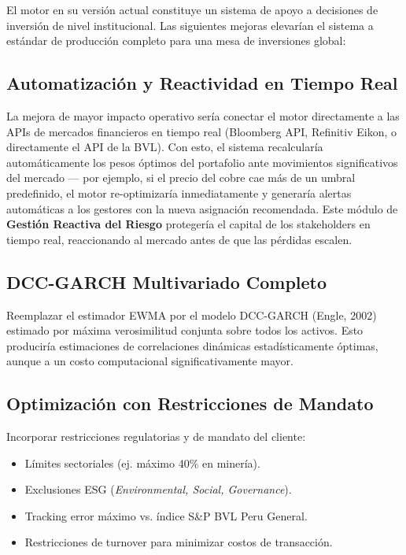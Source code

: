 \documentclass[11pt,a4paper]{article}
\begin{document}
El motor en su versión actual constituye un sistema de apoyo a decisiones de inversión
de nivel institucional. Las siguientes mejoras elevarían el sistema a estándar
de producción completo para una mesa de inversiones global:

\subsection{Automatización y Reactividad en Tiempo Real}

La mejora de mayor impacto operativo sería conectar el motor directamente a las APIs
de mercados financieros en tiempo real (Bloomberg API, Refinitiv Eikon, o directamente
el API de la BVL). Con esto, el sistema recalcularía automáticamente los pesos óptimos
del portafolio ante movimientos significativos del mercado — por ejemplo, si el precio
del cobre cae más de un umbral predefinido, el motor re-optimizaría inmediatamente y
generaría alertas automáticas a los gestores con la nueva asignación recomendada.
Este módulo de \textbf{Gestión Reactiva del Riesgo} protegería el capital de los
stakeholders en tiempo real, reaccionando al mercado antes de que las pérdidas escalen.

\subsection{DCC-GARCH Multivariado Completo}

Reemplazar el estimador EWMA por el modelo DCC-GARCH (Engle, 2002) estimado por
máxima verosimilitud conjunta sobre todos los activos. Esto produciría estimaciones
de correlaciones dinámicas estadísticamente óptimas, aunque a un costo computacional
significativamente mayor.

\subsection{Optimización con Restricciones de Mandato}

Incorporar restricciones regulatorias y de mandato del cliente:
\begin{itemize}[leftmargin=*]
    \item Límites sectoriales (ej. máximo 40\% en minería).
    \item Exclusiones ESG (\textit{Environmental, Social, Governance}).
    \item Tracking error máximo vs. índice S\&P BVL Peru General.
    \item Restricciones de turnover para minimizar costos de transacción.
\end{itemize}
\end{document}
